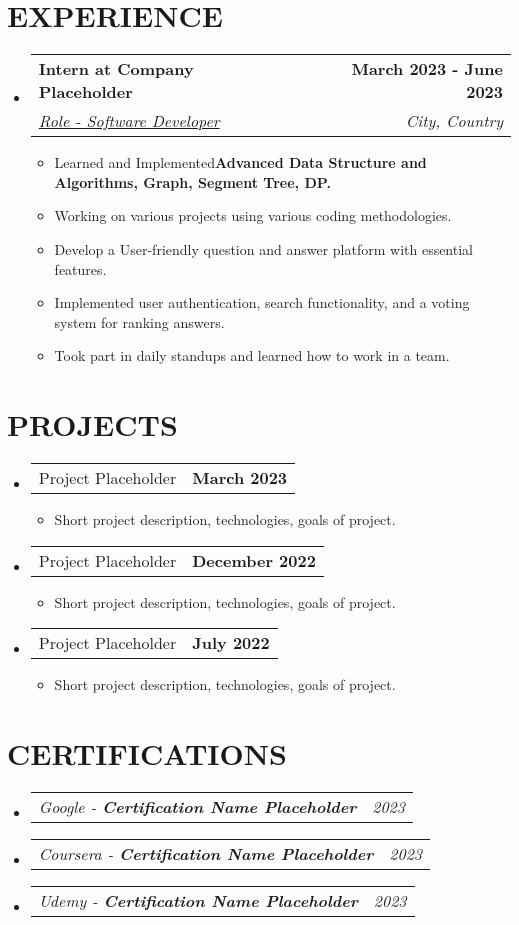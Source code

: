 \documentclass[letterpaper,11pt]{article}
\makeatletter
\newcommand{\resumeItem}[1]{
  \item\small{
    {#1 \vspace{-2pt}}
  }
}
\newcommand{\resumeSubheading}[4]{
  \vspace{-2pt}\item
    \begin{tabular*}{1.0\textwidth}[t]{l@{\extracolsep{\fill}}r}
      \textbf{\large#1} & \textbf{\small #2} \\
      \textit{\large#3} & \textit{\small #4} \\
      
    \end{tabular*}\vspace{-7pt}
}
\newcommand{\resumeSubSubheading}[2]{
    \item
    \begin{tabular*}{0.97\textwidth}{l@{\extracolsep{\fill}}r}
      \textit{\small#1} & \textit{\small #2} \\
    \end{tabular*}\vspace{-7pt}
}
\newcommand{\resumeProjectHeading}[2]{
    \item
    \begin{tabular*}{1.001\textwidth}{l@{\extracolsep{\fill}}r}
      \small#1 & \textbf{\small #2}\\
    \end{tabular*}\vspace{-7pt}
}
\newcommand{\resumeSubHeadingListStart}{\begin{itemize}[leftmargin=0.0in, label={}]}
\newcommand{\resumeSubHeadingListEnd}{\end{itemize}}
\newcommand{\resumeItemListStart}{\begin{itemize}}
\newcommand{\resumeItemListEnd}{\end{itemize}\vspace{-5pt}}
\makeatother
\begin{document}
\section{EXPERIENCE}
  \resumeSubHeadingListStart

    \resumeSubheading
      {Intern at Company Placeholder \href{https://placeholder.com}{\raisebox{-0.1\height}\faExternalLink }}{March 2023 - June 2023} 
      {\underline{Role - Software Developer}}{City, Country}
      \resumeItemListStart
        \resumeItem{\normalsize{Learned and Implemented\textbf{Advanced Data Structure and Algorithms, Graph, Segment Tree, DP.}}}
        \resumeItem{\normalsize{Working on various projects using various coding methodologies.}}
        \resumeItem{\normalsize{Develop a User-friendly question and answer platform with essential features.}}
        \resumeItem{\normalsize{Implemented user authentication, search functionality, and a voting system for ranking answers.}}
        \resumeItem{\normalsize{Took part in daily standups and learned how to work in a team.}}
      \resumeItemListEnd

  \resumeSubHeadingListEnd

\section{PROJECTS}
  \resumeSubHeadingListStart
    \resumeProjectHeading
      {Project Placeholder}{March 2023}
      \resumeItemListStart
        \resumeItem{\normalsize{Short project description, technologies, goals of project.}}
      \resumeItemListEnd

    \resumeProjectHeading
      {Project Placeholder}{December 2022}
      \resumeItemListStart
        \resumeItem{\normalsize{Short project description, technologies, goals of project.}}
      \resumeItemListEnd

    \resumeProjectHeading
      {Project Placeholder}{July 2022}
      \resumeItemListStart
        \resumeItem{\normalsize{Short project description, technologies, goals of project.}}
      \resumeItemListEnd

  \resumeSubHeadingListEnd



\section{CERTIFICATIONS}
  \resumeSubHeadingListStart
    \resumeSubSubheading
      {Google - \textbf{Certification Name Placeholder}}{2023}
    \resumeSubSubheading
      {Coursera - \textbf{Certification Name Placeholder}}{2023}
    \resumeSubSubheading
      {Udemy - \textbf{Certification Name Placeholder}}{2023}
    \resumeSubHeadingListEnd
\end{document}
